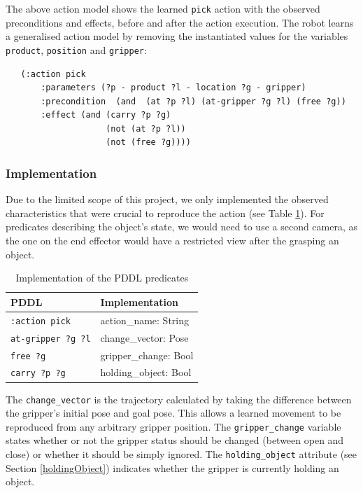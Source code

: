 The above action model shows the learned \texttt{pick} action with the observed preconditions and effects, before and after the action execution. 
The robot learns a generalised action model by removing the instantiated values for the variables \texttt{product}, \texttt{position} and \texttt{gripper}:

\begin{verbatim}
   (:action pick
       :parameters (?p - product ?l - location ?g - gripper)
       :precondition  (and  (at ?p ?l) (at-gripper ?g ?l) (free ?g))
       :effect (and (carry ?p ?g)
                    (not (at ?p ?l)) 
                    (not (free ?g))))
\end{verbatim}

\subsubsection{Implementation}
Due to the limited scope of this project, we only implemented the observed characteristics that were crucial to reproduce the action (see Table \ref{tab:PDDL implementation}). For predicates describing the object's state, we would need to use a second camera, as the one on the end effector would have a restricted view after the grasping an object.

\begin{table}[h]
\begin{center}
\begin{tabular}{l|l}
PDDL & Implementation\\ \hline
\texttt{:action pick} & action_name: String\\
\texttt{at-gripper ?g ?l} & change_vector: Pose\\
\texttt{free ?g } & gripper_change: Bool\\
\texttt{carry ?p ?g} & holding_object: Bool
\end{tabular}
\label{tab:PDDL implementation}
\caption{Implementation of the PDDL predicates}
\end{center}
\end{table}

The \texttt{change_vector} is the trajectory calculated by taking the difference between the gripper's initial pose and goal pose. This allows a learned movement to be reproduced from any arbitrary gripper position.
The \texttt{gripper_change} variable states whether or not the gripper status should be changed (between open and close) or whether it should be simply ignored. The \texttt{holding_object} attribute (see Section \ref{holdingObject}) indicates whether the gripper is currently holding an object.

